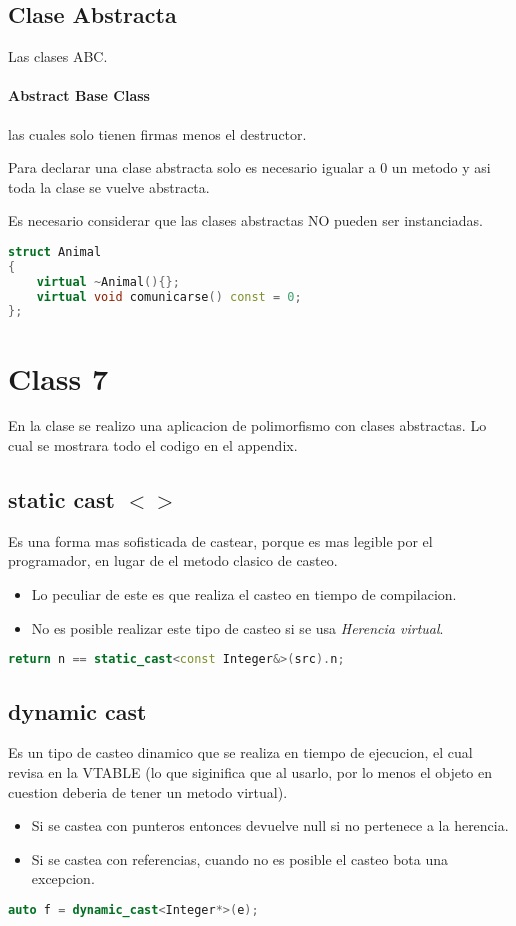 \documentclass[11pt,letterpaper]{article}
\begin{document}
\subsection{Clase Abstracta}
Las clases ABC.
\paragraph{Abstract Base Class} las cuales solo tienen firmas
menos el destructor.

Para declarar una clase abstracta solo es necesario igualar a 0 
un metodo y asi toda la clase se vuelve abstracta. \par
Es necesario considerar que las clases abstractas NO pueden ser instanciadas.
\begin{lstlisting}[language=C++, caption={Declaracion de clase abstracta}]
struct Animal
{
    virtual ~Animal(){};
    virtual void comunicarse() const = 0;
};
\end{lstlisting}

\section{Class 7}
En la clase se realizo una aplicacion de polimorfismo con clases abstractas.
Lo cual se mostrara todo el codigo en el appendix.
\subsection{static cast $<$$>$}
Es una forma mas sofisticada de castear, porque es mas legible 
por el programador, en lugar de el metodo clasico de casteo.
\begin{itemize}
    \item Lo peculiar de este es que realiza el casteo en tiempo de compilacion.
    \item No es posible realizar este tipo de casteo si se usa \textit{Herencia virtual}.
\end{itemize}
\begin{lstlisting}[language=C++, caption={static cast}]
return n == static_cast<const Integer&>(src).n;
\end{lstlisting}
\subsection{dynamic cast} 
Es un tipo de casteo dinamico que se realiza en tiempo de ejecucion, el cual
revisa en la VTABLE (lo que siginifica que al usarlo, por lo menos el objeto en 
cuestion deberia de tener un metodo virtual).
\begin{itemize}
    \item Si se castea con punteros entonces devuelve null si no pertenece a la herencia.
    \item Si se castea con referencias, cuando no es posible el casteo bota una excepcion.
\end{itemize}
\begin{lstlisting}[language=C++, caption={static cast}]
auto f = dynamic_cast<Integer*>(e);
\end{lstlisting}
\end{document}
